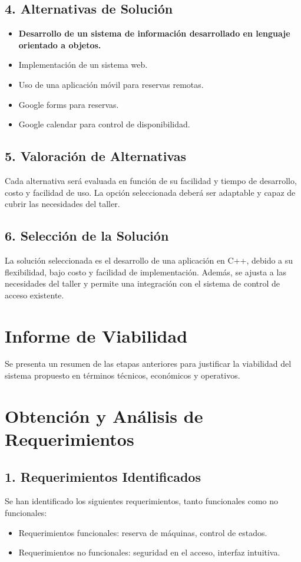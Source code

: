 \documentclass[12pt]{article}
\begin{document}
\subsection{4. Alternativas de Solución}
\begin{itemize}
    \item \textbf{Desarrollo de un sistema de información desarrollado en lenguaje orientado a objetos.}
    \item Implementación de un sistema web.
    \item Uso de una aplicación móvil para reservas remotas.
    \item Google forms para reservas.
    \item Google calendar para control de disponibilidad.
\end{itemize}

\subsection{5. Valoración de Alternativas}
Cada alternativa será evaluada en función de su facilidad y tiempo de desarrollo, costo y facilidad de uso. La opción seleccionada deberá ser adaptable y capaz de cubrir las necesidades del taller.

\subsection{6. Selección de la Solución}
La solución seleccionada es el desarrollo de una aplicación en C++, debido a su flexibilidad, bajo costo y facilidad de implementación. Además, se ajusta a las necesidades del taller y permite una integración con el sistema de control de acceso existente. 



\newpage
\section{Informe de Viabilidad}
Se presenta un resumen de las etapas anteriores para justificar la viabilidad del sistema propuesto en términos técnicos, económicos y operativos.

\section{Obtención y Análisis de Requerimientos}

\subsection{1. Requerimientos Identificados}
Se han identificado los siguientes requerimientos, tanto funcionales como no funcionales:
\begin{itemize}
    \item Requerimientos funcionales: reserva de máquinas, control de estados.
    \item Requerimientos no funcionales: seguridad en el acceso, interfaz intuitiva.
\end{itemize}
\end{document}
